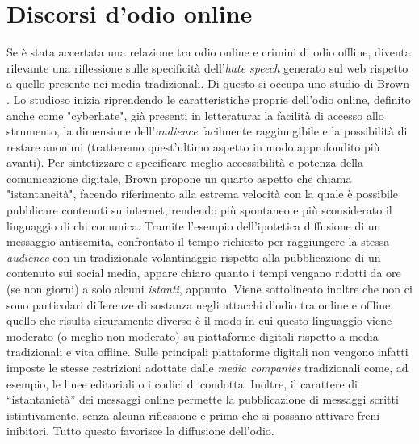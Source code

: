 \section{Discorsi d'odio online}
Se è stata accertata una relazione tra odio online e crimini di odio offline, diventa rilevante una riflessione sulle specificità dell’\textit{hate speech} generato sul web rispetto a quello presente nei media tradizionali. Di questo si occupa uno studio di Brown \citep{brown2018}. Lo studioso inizia riprendendo le caratteristiche proprie dell’odio online, definito anche come "cyberhate", già presenti in letteratura: la facilità di accesso allo strumento, la dimensione dell'\textit{audience} facilmente raggiungibile e la possibilità di restare anonimi (tratteremo quest'ultimo aspetto in modo approfondito più avanti). Per sintetizzare e specificare meglio accessibilità e potenza della comunicazione digitale, Brown propone un quarto aspetto che chiama "istantaneità", facendo riferimento alla estrema velocità con la quale è possibile pubblicare contenuti su internet, rendendo più spontaneo e più sconsiderato il linguaggio di chi comunica. Tramite l'esempio dell'ipotetica diffusione di un messaggio antisemita, confrontato il tempo richiesto per raggiungere la stessa \textit{audience} con un tradizionale volantinaggio rispetto alla pubblicazione di un contenuto sui social media, appare chiaro quanto i tempi vengano ridotti da ore (se non giorni) a solo alcuni \textit{istanti}, appunto.
Viene sottolineato inoltre che non ci sono particolari differenze di sostanza negli attacchi d'odio tra online e offline, quello che risulta sicuramente diverso è il modo in cui questo linguaggio viene moderato (o meglio non moderato) su piattaforme digitali rispetto a media tradizionali e vita offline. Sulle principali piattaforme digitali non vengono infatti imposte le stesse restrizioni adottate dalle \textit{media companies} tradizionali come, ad esempio, le linee editoriali o i codici di condotta. Inoltre, il carattere di “istantanietà” dei messaggi online permette la pubblicazione di messaggi scritti istintivamente, senza alcuna riflessione
e prima che si possano attivare freni inibitori. Tutto questo favorisce la diffusione dell’odio.

